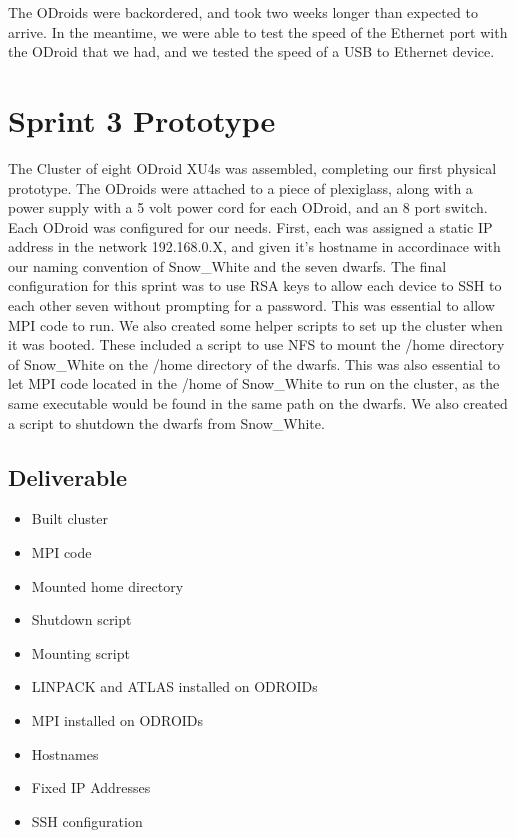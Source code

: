 The ODroids were backordered, and took two weeks longer than expected to arrive. In the meantime, we were able to test the speed of the Ethernet port with the ODroid that we had, and we tested the speed of a USB to Ethernet device. 

\section{Sprint 3 Prototype}

The Cluster of eight ODroid XU4s was assembled, completing our first physical prototype. The ODroids were attached to a piece of plexiglass, along with a power supply with a 5 volt power cord for each ODroid, and an 8 port switch. Each ODroid was configured for our needs. First, each was assigned a static IP address in the network 192.168.0.X, and given it's hostname in accordinace with our naming convention of Snow_White and the seven dwarfs. The final configuration for this sprint was to use RSA keys to allow each device to SSH to each other seven without prompting for a password. This was essential to allow MPI code to run. We also created some helper scripts to set up the cluster when it was booted. These included a script to use NFS to mount the /home directory of Snow_White on the /home directory of the dwarfs. This was also essential to let MPI code located in the /home of Snow_White to run on the cluster, as the same executable would be found in the same path on the dwarfs. We also created a script to shutdown the dwarfs from Snow_White. 

\subsection{Deliverable}

\begin{itemize}
\item Built cluster
\item MPI code
\item Mounted home directory
\item Shutdown script
\item Mounting script
\item LINPACK and ATLAS installed on ODROIDs
\item MPI installed on ODROIDs
\item Hostnames
\item Fixed IP Addresses
\item SSH configuration
\end{itemize}

